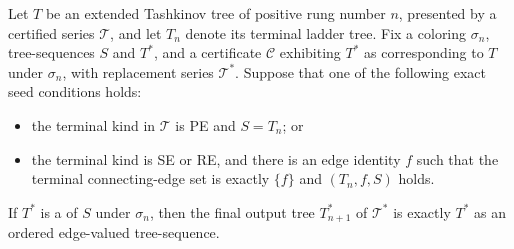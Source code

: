 \begin{lemma}
Let \(T\) be an extended Tashkinov tree of positive rung number \(n\),
presented by a certified series \(\mathcal T\), and let \(T_n\) denote its
terminal ladder tree.  Fix a coloring \(\sigma_n\), tree-sequences \(S\) and
\(T^*\), and a  certificate
\(\mathcal C\) exhibiting \(T^*\) as corresponding to \(T\) under
\(\sigma_n\), with replacement series \(\mathcal T^*\).  Suppose that one
of the following exact seed conditions holds:
\begin{itemize}
\item the terminal kind in \(\mathcal T\) is PE and \(S=T_n\); or
\item the terminal kind is SE or RE, and there is an edge identity \(f\)
such that the terminal connecting-edge set is exactly \(\{f\}\) and
\((T_n,f,S)\) holds.
\end{itemize}
If \(T^*\) is a  of \(S\) under \(\sigma_n\),
then the final output tree \(T^*_{n+1}\) of \(\mathcal T^*\) is exactly
\(T^*\) as an ordered edge-valued tree-sequence.
\end{lemma}
